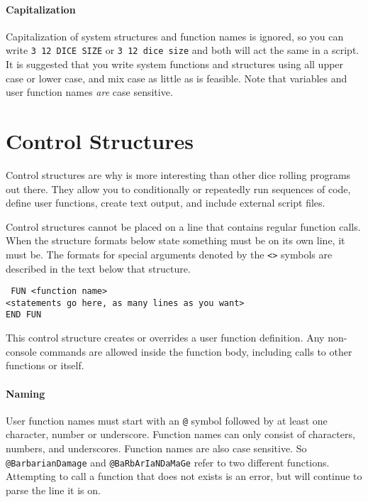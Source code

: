 \paragraph*{Capitalization\\}
\hspace*{\parindent}%
Capitalization of system structures and function names is ignored, so you can
write \texttt{3 12 DICE SIZE} or \texttt{3 12 dice size} and both will act
the same in a script. It is suggested that you write system functions and
structures using all upper case or lower case, and mix case as little as is
feasible. Note that variables and user function names \emph{are} case sensitive.

\section{Control Structures}
\label{controlStructures}
Control structures are why \progLogo is more interesting than other
dice rolling programs out there. They allow you to conditionally or repeatedly
run sequences of code, define user functions, create text output, and include
external script files.

Control structures cannot be placed on a line that contains regular function
calls. When the structure formats below state something must be on its own line,
it must be. The formats for special arguments denoted by the \texttt{<>} symbols
are described in the text below that structure.

\noindent\texttt{%
FUN <function name>\\
<statements go here, as many lines as you want>\\
END FUN}

This control structure creates or overrides a user function definition. Any
non-console commands are allowed inside the function body, including calls to
other functions or itself.

\paragraph*{Naming\\}
\hspace*{\parindent}User function names must start with an \texttt{@} symbol
followed by at least
one character, number or underscore. Function names can only consist of
characters, numbers, and underscores. Function names are also case sensitive.
So \texttt{@BarbarianDamage} and \texttt{@BaRbArIaNDaMaGe} refer to two
different functions. Attempting to call a function that does not exists is an
error, but \progLogo  will continue to parse the line it is on.

